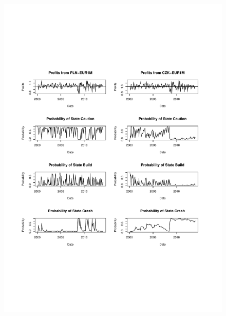 \documentclass[12pt, a4paper, oneside]{article} %
\begin{document}
\begin{figure}[h!]
\centering
\includegraphics[scale = .80]{../Figures/3RegProb/PLNCZKEUR.pdf}
\end{figure}
\end{document}
